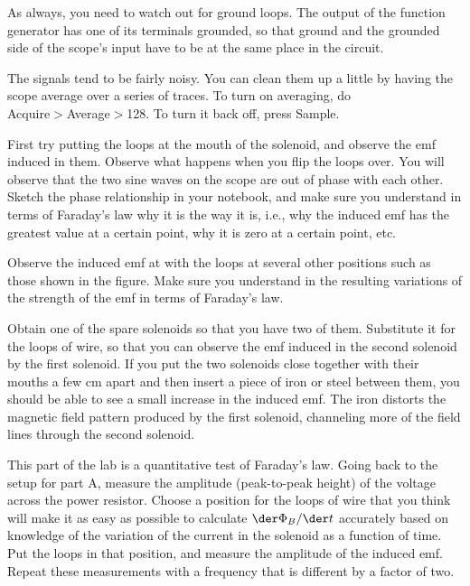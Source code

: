As always, you need to watch out for ground loops. The output
of the function generator has one of its terminals grounded,
so that ground and the grounded side of the scope's input have
to be at the same place in the circuit.

The signals tend to be fairly noisy. You can clean them up
a little by having the scope average over a series of traces.
To turn on averaging, do\\
 Acquire$>$Average$>$128. To turn it back
off, press Sample.

First try putting the loops at the mouth of the solenoid,
and observe the emf induced in them. Observe what happens
when you flip the loops over. You will observe that the two
sine waves on the scope are out of phase with each other.
Sketch the phase relationship in your notebook, and make
sure you understand in terms of Faraday's law why it is the
way it is, i.e., why the induced emf has the greatest value
at a certain point, why it is zero at a certain point, etc.

Observe the induced emf at with the loops at several other
positions such as those shown in the figure. Make sure you
understand in the resulting variations of the strength of
the emf in terms of Faraday's law.


Obtain one of the spare solenoids so that you have two of
them. Substitute it for the loops of wire, so that you can
observe the emf induced in the second solenoid by the first
solenoid. If you put the two solenoids close together with
their mouths a few cm apart and then insert a piece of iron
or steel between them, you should be able to see a small
increase in the induced emf. The iron distorts the magnetic
field pattern produced by the first solenoid, channeling
more of the field lines through the second solenoid.


This part of the lab is a quantitative test of Faraday's
law. Going back to the setup for part A, measure the
amplitude (peak-to-peak height) of the voltage across the
power resistor. Choose a position for the loops of wire that
you think will make it as easy as possible to calculate $\der \Phi_B/\der t$
accurately based on knowledge of the variation of the
current in the solenoid as a function of time. Put the loops
in that position, and measure the amplitude of the induced
emf. Repeat these measurements with a frequency that
is different by a factor of two.

